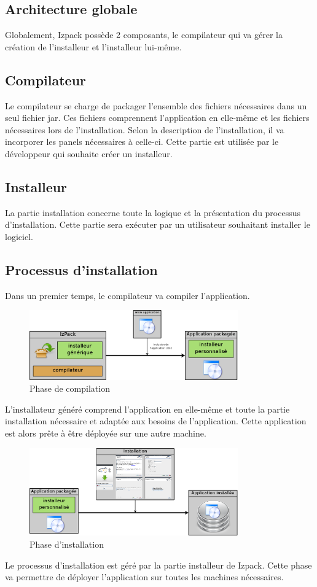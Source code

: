 \subsection{Architecture globale}
Globalement, Izpack possède 2 composants, le compilateur qui va gérer la création de l'installeur et l'installeur lui-même.
\subsection{Compilateur}
Le compilateur se charge de packager l'ensemble des fichiers nécessaires dans un seul fichier jar.
Ces fichiers comprennent l'application en elle-même et les fichiers nécessaires lors de l'installation. 
Selon la description de l'installation, il va incorporer les panels nécessaires à celle-ci.
Cette partie est utilisée par le développeur qui souhaite créer un installeur.
\subsection{Installeur}
La partie installation concerne toute la logique et la présentation du processus d'installation. Cette partie sera exécuter par un utilisateur souhaitant installer le logiciel.
\subsection{Processus d'installation}
Dans un premier temps, le compilateur va compiler l'application.



\begin{figure}[H]
	\centering
	\includegraphics[width=0.8\textwidth]{../image/partie_compil.png}
	\caption{Phase de compilation}
\end{figure}
L'installateur généré comprend l'application en elle-même et toute la partie installation nécessaire et adaptée aux besoins de l'application.
Cette application est alors prête à être déployée sur une autre machine.
\begin{figure}[H]
	\centering
	\includegraphics[width=0.8\textwidth]{../image/partie_install.png}
	\caption{Phase d'installation}
\end{figure}
Le processus d'installation est géré par la partie installeur de Izpack. Cette phase va permettre de déployer l'application sur toutes les machines nécessaires.

